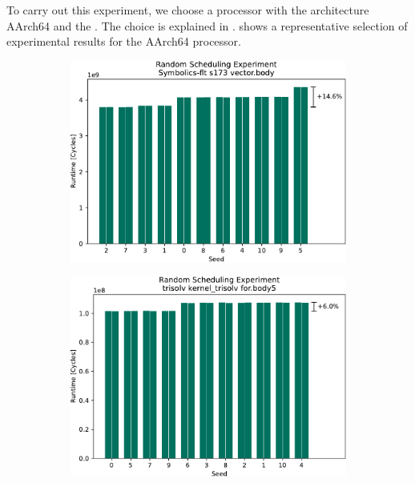 To carry out this experiment, we choose a processor with the architecture AArch64 and the \aurora{}.
The choice is explained in .
 shows a representative selection of experimental results for the AArch64 processor.
\begin{figure}
    \begin{subfigure}{0.0325\textwidth}\caption{}\label{fig:eval:rndm:aarch64:a}\end{subfigure}
    \begin{subfigure}{0.44\textwidth}
        \includegraphics[width=\textwidth]{img/random-scheduling-experiment-pi-collected/Symbolics-flt-crop.pdf}
    \end{subfigure}
    \hfill
    \begin{subfigure}{0.0325\textwidth}\caption{}\label{fig:eval:rndm:aarch64:b}\end{subfigure}
    \begin{subfigure}{0.44\textwidth}
        \includegraphics[width=\textwidth]{img/random-scheduling-experiment-pi-collected/trisolv-crop.pdf}
    \end{subfigure}


\end{figure}
